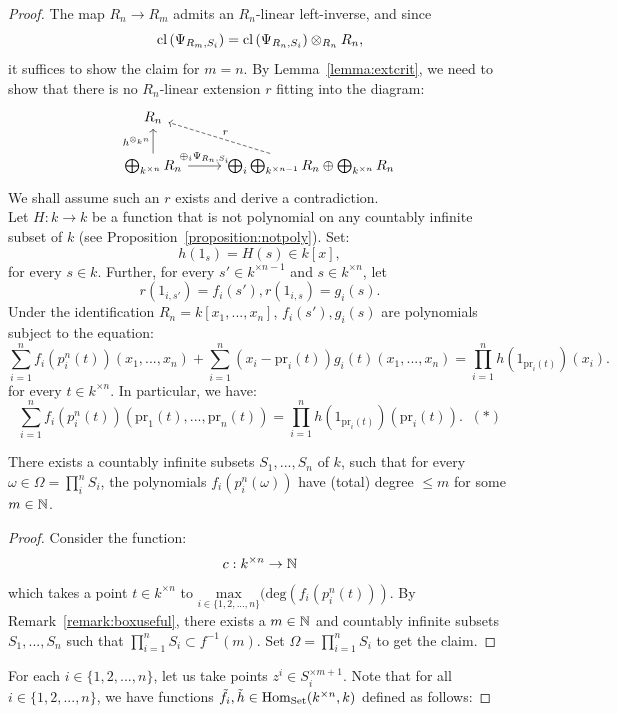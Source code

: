 \begin{proof}
The map $R_n \to R_m$ admits an $R_n$-linear left-inverse, and since 
\[\mathrm{cl}\left(\Psi_{R_m,S_i}\right) = \mathrm{cl}\left(\Psi_{R_n,S_i}\right) \otimes_{R_n} R_n, \]
it suffices to show the claim for $m=n$. By Lemma~\ref{lemma:extcrit}, we need to show that there is no $R_n$-linear extension $r$ fitting into the diagram:
\[\begin{tikzcd} R_n & \\
\bigoplus_{k^{\times n}} R_n \arrow[r, "\oplus_i \Psi_{R_n,S_i}"] \arrow[u, "h^{\otimes_k n}"] & \bigoplus_{i} \bigoplus_{k^{\times n-1}} R_n \oplus \bigoplus_{k^{\times n}} R_n \arrow[ul, swap, "r", dashed]\end{tikzcd}\]
We shall assume such an $r$ exists and derive a contradiction.\\
\indent Let $H: k \to k$ be a function that is not polynomial on any countably infinite subset of $k$ (see Proposition~\ref{proposition:notpoly}). Set:
\[h(1_{s}) = H(s) \in k[x],\]
for every $s \in k$. Further, for every $s' \in k^{\times n-1}$ and $s \in k^{\times n}$, let
\[r(1_{i,s'}) = f_i(s'), r(1_{i,s}) = g_i(s).\]
Under the identification $R_n = k[x_1,...,x_n]$, $f_i(s'), g_i(s)$ are polynomials subject to the equation:
\[\sum^n_{i=1} f_i(p^n_i(t))(x_1,...,x_n) + \sum^n_{i=1} (x_i - \text{pr}_i(t)) g_i(t)(x_1,...,x_n) = \prod^n_{i=1} h(1_{\text{pr}_i(t)})(x_i).\]
for every $t \in k^{\times n}$. In particular, we have:
\[\sum^n_{i=1} f_i(p^n_i(t))(\text{pr}_1(t),...,\text{pr}_n(t)) = \prod^n_{i=1} h(1_{\text{pr}_i(t)})(\text{pr}_i(t)). \; \; (*)\]
\begin{claim}
There exists a countably infinite subsets $S_1, ..., S_n$ of $k$, such that for every $\omega \in \Omega =\prod^n_i S_i$, the polynomials $f_i(p^n_i(\omega))$ have (total) degree $\le m$ for some $m \in \mathbb{N}$.
\end{claim}
\begin{proof}
Consider the function:
\[c: k^{\times n} \rightarrow \mathbb{N}\]
which takes a point $t \in k^{\times n}$ to $\underset{i\in\{1,2,...,n\}}{\text{max}}(\text{deg}(f_i(p^n_i(t)))$. By Remark~\ref{remark:boxuseful}, there exists a $m \in \mathbb{N}$ and countably infinite subsets $S_1, ..., S_n$ such that $ \prod_{i=1}^{n} S_i \subset f^{-1}(m)$. Set $\Omega = \prod_{i=1}^n S_i$ to get the claim.
\end{proof}
For each $i \in \{1,2,...,n\}$, let us take points $z^i \in S_i^{\times m+1}$. Note that for all $i \in \{1,2,...,n\}$, we have functions $\tilde{f}_i, \tilde{h} \in \operatorname{Hom}_{\mathrm{Set}}(k^{\times n},k)$ defined as follows:

\end{proof}
